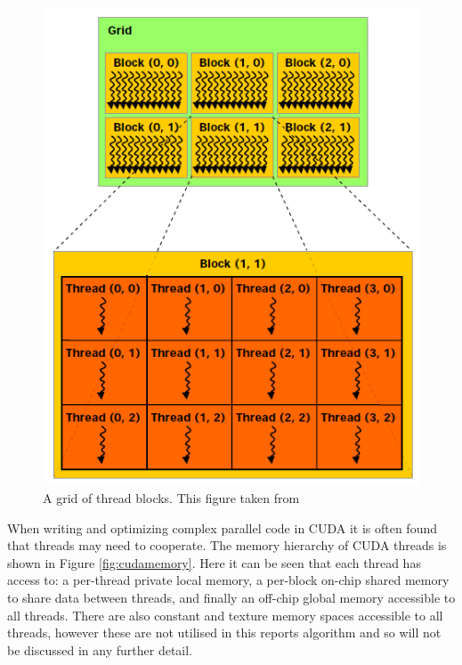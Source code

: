 \begin{figure}[p]
	\centering
		\includegraphics[scale=0.4]{images/cudathreads.PNG}
		\caption{A grid of thread blocks. This figure taken from \cite{cuda}}
	\label{fig:cudathreads}
\end{figure}

When writing and optimizing complex parallel code in CUDA it is often found that threads may need to cooperate. The memory hierarchy of CUDA threads is shown in Figure \ref{fig:cudamemory}. Here it can be seen that each thread has access to: a per-thread private local memory, a per-block on-chip shared memory to share data between threads, and finally an off-chip global memory accessible to all threads. There are also constant and texture memory spaces accessible to all threads, however these are not utilised in this reports algorithm and so will not be discussed in any further detail.

